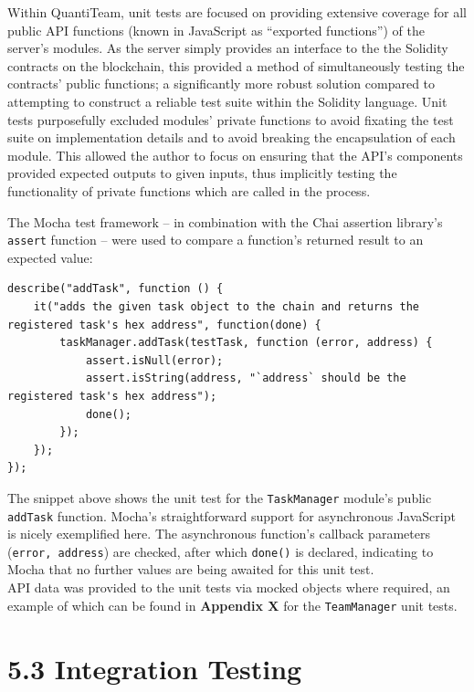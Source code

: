 \documentclass[12pt]{report}
\begin{document}
Within QuantiTeam, unit tests are focused on providing extensive
coverage for all public API functions (known in JavaScript as ``exported
functions'') of the server's modules. As the server simply provides an
interface to the the Solidity contracts on the blockchain, this provided
a method of simultaneously testing the contracts' public functions; a
significantly more robust solution compared to attempting to construct a
reliable test suite within the Solidity language. Unit tests
purposefully excluded modules' private functions to avoid fixating the
test suite on implementation details and to avoid breaking the
encapsulation of each
module\cite{hunt2003pragmatic}. This allowed the author to focus on ensuring that the API's
components provided expected outputs to given inputs, thus implicitly
testing the functionality of private functions which are called in the
process.

The Mocha test framework -- in combination with the Chai assertion
library's \texttt{assert} function -- were used to compare a function's
returned result to an expected value:

\begin{verbatim}
describe("addTask", function () {
    it("adds the given task object to the chain and returns the registered task's hex address", function(done) {
        taskManager.addTask(testTask, function (error, address) {
            assert.isNull(error);
            assert.isString(address, "`address` should be the registered task's hex address");
            done();
        });
    });
});
\end{verbatim}

The snippet above shows the unit test for the \texttt{TaskManager}
module's public \texttt{addTask} function. Mocha's straightforward
support for asynchronous JavaScript is nicely exemplified here. The
asynchronous function's callback parameters (\texttt{error,\ address})
are checked, after which \texttt{done()} is declared, indicating to
Mocha that no further values are being awaited for this unit test.\\
API data was provided to the unit tests via mocked objects where
required, an example of which can be found in \textbf{Appendix X} for
the \texttt{TeamManager} unit tests.

\section{5.3 Integration Testing}\label{integration-testing}
\end{document}
